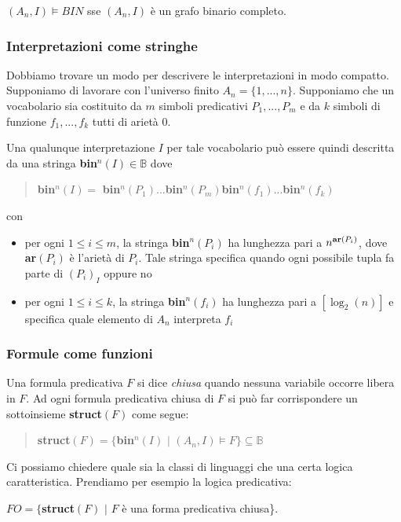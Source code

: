 \documentclass{article}
\begin{document}
\bigskip

$(A_ n,I)\vDash BIN$ sse $(A_n,I)$ è un grafo binario completo.

\subsubsection{Interpretazioni come stringhe}
Dobbiamo trovare un modo per descrivere le interpretazioni in modo compatto. Supponiamo di lavorare con l'universo finito $A_n=\{1,...,n\}$. Supponiamo che un vocabolario sia costituito da $m$ simboli predicativi $P_1,...,P_m$ e da $k$ simboli di funzione $f_1,...,f_k$ tutti di arietà 0.

\bigskip

Una qualunque interpretazione $I$ per tale vocabolario può essere quindi descritta da una stringa \textbf{bin}$^n(I)\in\mathbb{B}$ dove 
\begin{quote}
    \textbf{bin}$^n(I)=$ \textbf{bin}$^n(P_1)$...\textbf{bin}$^n(P_m)$\textbf{bin}$^n(f_1)$...\textbf{bin}$^n(f_k)$
\end{quote}
con
\begin{itemize}
    \item per ogni $1\leq i\leq m$, la stringa \textbf{bin}$^n(P_i)$ ha lunghezza pari a $n^{\text{\textbf{ar}}(P_i)}$, dove \textbf{ar}$(P_i)$ è l'arietà di $P_i$. Tale stringa specifica quando ogni possibile tupla fa parte di $(P_i)_I$ oppure no
    \item per ogni $1\leq i\leq k$, la stringa \textbf{bin}$^n(f_i)$ ha lunghezza pari a $[\log_2(n)]$ e specifica quale elemento di $A_n$ interpreta $f_i$
\end{itemize}

\subsubsection{Formule come funzioni}
Una formula predicativa $F$ si dice {\color{red}\textit{chiusa}} quando nessuna variabile occorre libera in $F$. Ad ogni formula predicativa chiusa di $F$ si può far corrispondere un sottoinsieme \textbf{struct}$(F)$ come segue:
\begin{quote}
    \textbf{struct}$(F)=\{$\textbf{bin}$^n(I)\,\,|\,\,(A_n,I)\vDash F\}\subseteq\mathbb{B}$ 
\end{quote}

Ci possiamo chiedere quale sia la classi di linguaggi che una certa logica caratteristica. Prendiamo per esempio la logica predicativa:

$FO = \{$\textbf{struct}$(F)\,\,|\,\,F$ è una forma predicativa chiusa\}.
\end{document}
